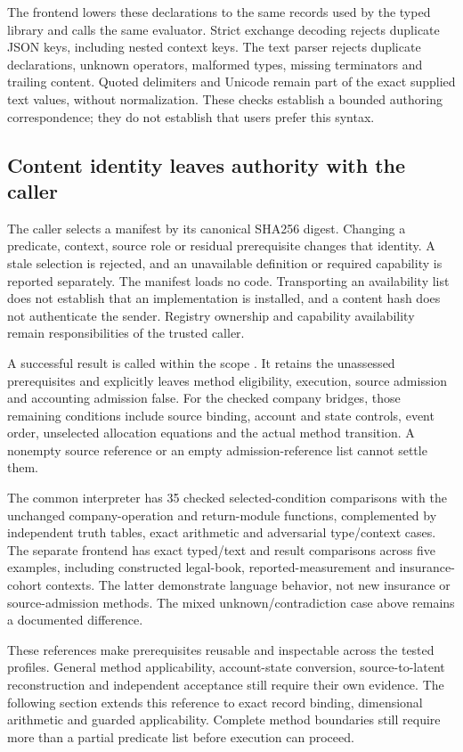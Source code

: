 The frontend lowers these declarations to the same records used by the typed
library and calls the same evaluator. Strict exchange decoding rejects duplicate
JSON keys, including nested context keys. The text parser rejects duplicate
declarations, unknown operators, malformed types, missing terminators and
trailing content. Quoted delimiters and Unicode remain part of the exact supplied
text values, without normalization. These checks establish a bounded authoring
correspondence; they do not establish that users prefer this syntax.

\subsection{Content identity leaves authority with the caller}

The caller selects a manifest by its canonical SHA256 digest. Changing a
predicate, context, source role or residual prerequisite changes that identity.
A stale selection is rejected, and an unavailable definition or required
capability is reported separately. The manifest loads no code. Transporting an
availability list does not establish that an implementation is installed, and
a content hash does not authenticate the sender. Registry ownership and
capability availability remain responsibilities of the trusted caller.

A successful result is called  within the scope
. It retains the unassessed prerequisites
and explicitly leaves method eligibility, execution, source admission and
accounting admission false. For the checked company bridges, those remaining
conditions include source binding, account and state controls, event order,
unselected allocation equations and the actual method transition. A nonempty
source reference or an empty admission-reference list cannot settle them.

The common interpreter has 35 checked selected-condition comparisons with the
unchanged company-operation and return-module functions, complemented by
independent truth tables, exact arithmetic and adversarial type/context cases.
The separate frontend has exact typed/text and result comparisons across five
examples, including constructed legal-book, reported-measurement and
insurance-cohort contexts. The latter demonstrate language behavior, not new
insurance or source-admission methods. The mixed unknown/contradiction case
above remains a documented difference.

These references make prerequisites reusable and inspectable across the tested
profiles. General method applicability, account-state conversion, source-to-latent
reconstruction and independent acceptance still require their own evidence.
The following section extends this reference to exact record binding,
dimensional arithmetic and guarded applicability. Complete method boundaries
still require more than a partial predicate list before execution can proceed.
